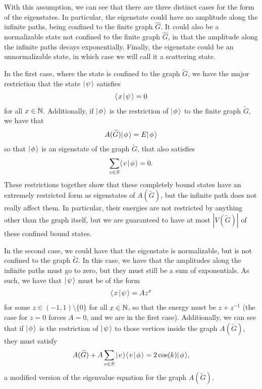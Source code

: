 \documentclass[../thesis-main/thesis-main]{subfiles}
\begin{document}
With this assumption, we can see that there are three distinct cases for the form of the eigenstates.  In particular, the eigenstate could have no amplitude along the infinite paths, being confined to the finite graph $\widehat{G}$.  It could also be a normalizable state not confined to the finite graph $\widehat{G}$, in that the amplitude along the infinite paths decays exponentially.  Finally, the eigenstate could be an unnormalizable state, in which case we will call it a scattering state.

In the first case, where the state is confined to the graph $\widetilde{G}$, we have the major restriction that the state $|\mspace{2mu} \psi \mspace{2mu} \rangle$ satisfies 
\begin{align}
  \langle\mspace{2mu} x \mspace{2mu} | \mspace{2mu} \psi\mspace{2mu} \rangle = 0
\end{align}
for all $x\in \mathbb{N}$.  Additionally, if $|\mspace{2mu} \phi \mspace{2mu} \rangle$ is the restriction of $|\mspace{2mu} \phi \mspace{2mu} \rangle$ to the finite graph $\widetilde{G}$, we have that 
\begin{align}
  A(\widetilde{G}) |\mspace{2mu} \phi \mspace{2mu} \rangle = E |\mspace{2mu} \phi \mspace{2mu} \rangle
\end{align}
so that $|\mspace{2mu} \phi \mspace{2mu} \rangle$ is an eigenstate of the graph $\widetilde{G}$, that also satisfies
\begin{align}
  \sum_{v\in S} \langle\mspace{2mu} v \mspace{2mu} | \mspace{2mu} \phi\mspace{2mu} \rangle = 0.
\end{align}
These restrictions together show that these completely bound states have an extremely restricted form as eigenstates of $A(\widetilde{G})$, but the infinite path does not really affect them.  In particular, their energies are not restricted by anything other than the graph itself, but we are guaranteed to have at most $|V(\widetilde{G})|$ of these confined bound states.

In the second case, we could have that the eigenstate is normalizable, but is not confined to the graph $\widetilde{G}$.  In this case, we have that the amplitudes along the infinite paths must go to zero, but they must still be a sum of exponentials.  As such, we have that $|\mspace{2mu} \psi \mspace{2mu} \rangle$ must be of the form
\begin{align}
  \langle\mspace{2mu} x \mspace{2mu} | \mspace{2mu} \psi\mspace{2mu} \rangle = A z^x
\end{align} 
for some $z\in (-1,1)\setminus \{0\}$ for all $x\in \mathbb{N}$, so that the energy must be $z+ z^{-1}$ (the case for $z= 0$ forces $A = 0$, and we are in the first case).  Additionally, we can see that if $|\mspace{2mu} \phi \mspace{2mu} \rangle$ is the restriction of $|\mspace{2mu} \psi \mspace{2mu} \rangle$ to those vertices inside the graph $A(\widetilde{G})$, they must satisfy
\begin{align}
  A(\widetilde{G}) + A \sum_{v\in S} |\mspace{2mu} v \mspace{2mu} \rangle\langle\mspace{2mu} v \mspace{2mu} | \mspace{2mu} \phi\mspace{2mu} \rangle = 2 \cos (k) |\mspace{2mu} \phi \mspace{2mu} \rangle,
\end{align}
a modified version of the eigenvalue equation for the graph $A(\widetilde{G})$.
\end{document}
